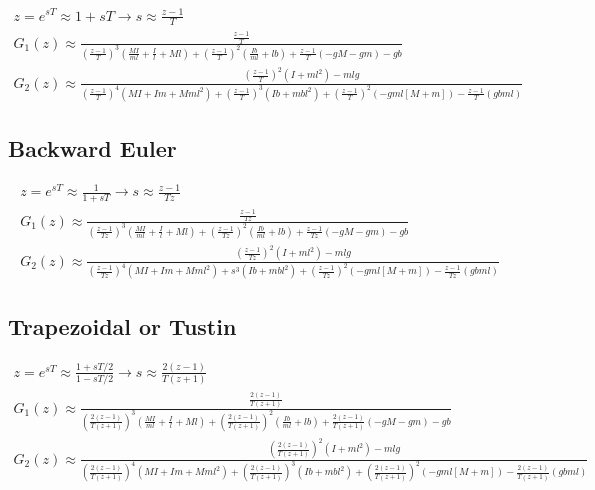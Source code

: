 		\begin{eqnarray}
			z = e^{sT} \approx 1 + sT \rightarrow s \approx \frac{z - 1}{T}\\
			G_1\left(z\right) \approx \frac{\frac{z - 1}{T}}{\left( \frac{z - 1}{T}\right) ^3\left(\frac{MI}{ml}+\frac{I}{l}+Ml\right)+\left( \frac{z - 1}{T}\right) ^2\left(\frac{Ib}{ml}+lb\right)+\frac{z - 1}{T}(-gM-gm)-gb}\\
			G_2\left(z\right)\approx \frac{\left( \frac{z - 1}{T}\right) ^2\left(I+ml^2\right)-mlg}{\left( \frac{z - 1}{T}\right) ^4\left(MI+Im+Mml^2\right)+\left( \frac{z - 1}{T}\right) ^3\left(Ib+m{bl}^2\right)+\left( \frac{z - 1}{T}\right) ^2\left(-gml\left[M+m\right]\right)-\frac{z - 1}{T}\left(gbml\right)}
		\end{eqnarray}
	
	\subsection{Backward Euler}
		
		\begin{eqnarray}
			z = e^{sT} \approx \frac{1}{1 + sT} \rightarrow s \approx \frac{z - 1}{Tz}\\			
			G_1\left(z\right)\approx\frac{\frac{z - 1}{Tz}}{\left( \frac{z - 1}{Tz}\right) ^3\left(\frac{MI}{ml}+\frac{I}{l}+Ml\right)+\left( \frac{z - 1}{Tz}\right) ^2\left(\frac{Ib}{ml}+lb\right)+\frac{z - 1}{Tz}(-gM-gm)-gb}
			\\
			G_2\left(z\right)\approx\frac{\left( \frac{z - 1}{Tz}\right) ^2\left(I+ml^2\right)-mlg}{\left( \frac{z - 1}{Tz}\right) ^4\left(MI+Im+Mml^2\right)+s^3\left(Ib+m{bl}^2\right)+\left( \frac{z - 1}{Tz}\right) ^2\left(-gml\left[M+m\right]\right)-\frac{z - 1}{Tz}\left(gbml\right)}
		\end{eqnarray}
	
	\subsection{Trapezoidal or Tustin}
		\begin{tiny}
		\begin{eqnarray}
			z = e^{sT} \approx \frac{1 + sT/2}{1 - sT/2} \rightarrow s \approx \frac{2\left( z - 1\right) }{T\left( z+1\right) }\\		
			G_1\left(z\right)\approx\frac{\frac{2\left( z - 1\right) }{T\left( z+1\right) }}{\left( \frac{2\left( z - 1\right) }{T\left( z+1\right) }\right) ^3\left(\frac{MI}{ml}+\frac{I}{l}+Ml\right)+\left( \frac{2\left( z - 1\right) }{T\left( z+1\right) }\right) ^2\left(\frac{Ib}{ml}+lb\right)+\frac{2\left( z - 1\right) }{T\left( z+1\right) }(-gM-gm)-gb}
			\\
			G_2\left(z\right)\approx\frac{\left( \frac{2\left( z - 1\right) }{T\left( z+1\right) }\right) ^2\left(I+ml^2\right)-mlg}{\left( \frac{2\left( z - 1\right) }{T\left( z+1\right) }\right) ^4\left(MI+Im+Mml^2\right)+\left( \frac{2\left( z - 1\right) }{T\left( z+1\right) }\right) ^3\left(Ib+m{bl}^2\right)+\left( \frac{2\left( z - 1\right) }{T\left( z+1\right) }\right) ^2\left(-gml\left[M+m\right]\right)-\frac{2\left( z - 1\right) }{T\left( z+1\right) }\left(gbml\right)}
		\end{eqnarray}
		\end{tiny}
		
